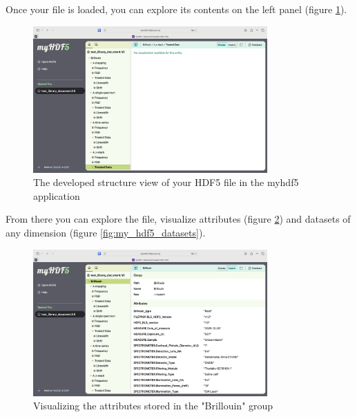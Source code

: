 \documentclass{article}
\begin{document}
Once your file is loaded, you can explore its contents on the left panel (figure \ref{fig:my_hdf5_structure}).

\begin{figure}[H]
    \centering
    \includegraphics[width=0.8\textwidth]{img/MyHDF5_Developped structure.png}
    \caption{The developed structure view of your HDF5 file in the myhdf5 application}
    \label{fig:my_hdf5_structure}
\end{figure}

From there you can explore the file, visualize attributes (figure \ref{fig:my_hdf5_attributes}) and datasets of any dimension (figure \ref{fig:my_hdf5_datasets}).

\begin{figure}[H]
    \centering
    \includegraphics[width=0.8\textwidth]{img/My_HDF5_attributes.png}
    \caption{Visualizing the attributes stored in the "Brillouin" group} 
    \label{fig:my_hdf5_attributes}
\end{figure}
\end{document}
